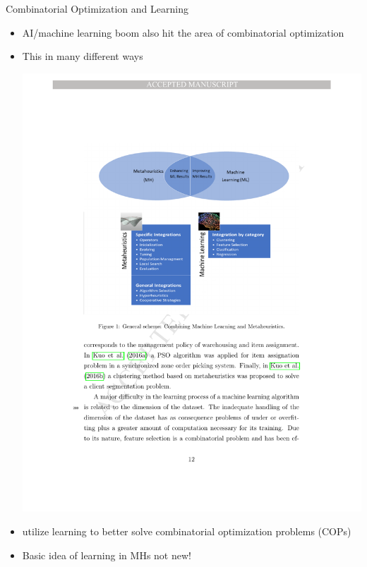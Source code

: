 \documentclass[aspectratio=1610]{beamer}
\newcommand{\important}[1]{{\color{green!60!black}#1}}
\begin{document}
\begin{frame}{Combinatorial Optimization and Learning}
	\begin{itemize}
		\itemsep2.5ex
		\item \important{AI/machine learning boom} also hit the area of \important{combinatorial optimization}
		\item This in many different ways
		\begin{center}
			\centering
			\includegraphics[width=0.85\linewidth]{figures/mh-ml}
		\end{center}
		\item {} utilize learning to better solve \important{combinatorial optimization problems (COPs)}
		\item \alert{Basic idea of learning in MHs not new!}
	\end{itemize}
\end{frame}
\end{document}
